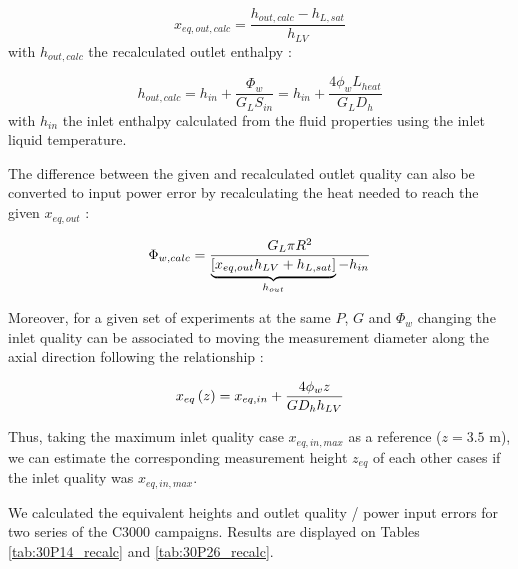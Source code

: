 \begin{equation}
x_{eq,out,calc} = \frac{h_{out,calc} - h_{L,sat}}{h_{LV}}
\label{eq:xeq_out}
\end{equation}
with $h_{out,calc}$ the recalculated outlet enthalpy  :

\begin{equation}
h_{out,calc} = h_{in} + \frac{\Phi_{w}}{G_{L}S_{in}} = h_{in} + \frac{4\phi_{w}L_{heat}}{G_{L}D_{h}}
\end{equation}
with $h_{in}$ the inlet enthalpy calculated from the fluid properties using the inlet liquid temperature.

\npar
The difference between the given and recalculated outlet quality can also be converted to input power error by recalculating the heat needed to reach the given $x_{eq,out}$  :

\begin{equation}
\Phi_{w,calc} = \frac{G_{L} \pi R^{2}}{\underbrace{\left[ x_{eq,out}h_{LV}+h_{L,sat} \right]}_{h_{out}} - h_{in}}
\end{equation}

\npar 


Moreover, for a given set of experiments at the same $P$, $G$ and $\Phi_{w}$ changing the inlet quality can be associated to moving the measurement diameter along the axial direction following the relationship : 

\begin{equation}
x_{eq}\left( z \right) = x_{eq,in} + \frac{4 \phi_{w} z }{G D_{h} h_{LV}}
\end{equation}

Thus, taking the maximum inlet quality case $x_{eq,in, max}$ as a reference ($z=3.5$ m), we can estimate the corresponding measurement height $z_{eq}$ of each other cases if the inlet quality was $x_{eq,in, max}$.

\npar

We calculated the equivalent heights and outlet quality / power input errors for two series of the C3000 campaigns. Results are displayed on Tables \ref{tab:30P14_recalc} and \ref{tab:30P26_recalc}.



